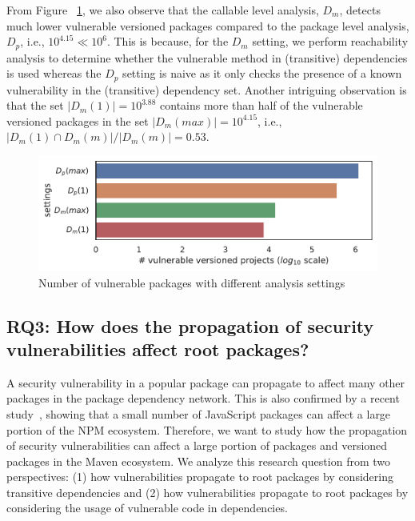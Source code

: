 From Figure ~\ref{ch3:fig:vuln_pkgs_analysis_comparison}, we also observe that the callable level analysis, $D_{m}$, detects much lower vulnerable versioned packages compared to the package level analysis, $D_{p}$, i.e., $10^{4.15} \ll 10^{6}$. This is because, for the $D_{m}$ setting, we perform reachability analysis to determine whether the vulnerable method in (transitive) dependencies is used whereas the $D_{p}$ setting is naive as it only checks the presence of a known vulnerability in the (transitive) dependency set. Another intriguing observation is that the set $|D_{m}(1)|=10^{3.88}$ contains more than half of the vulnerable versioned packages in the set $|D_{m}(max)|=10^{4.15}$, i.e., $|D_{m}(1) \cap D_{m}(m)|/|D_m(m)|=0.53$.

\begin{figure}[!t]
    \centering
    \includegraphics[width=\columnwidth]{chapters/ch3/figs/vuln_pkg_ver_dp_vs_dm.pdf}
    \caption{Number of vulnerable packages with different analysis settings}
    \label{ch3:fig:vuln_pkgs_analysis_comparison}
\end{figure}

\subsection{\textbf{RQ3}: How does the propagation of security vulnerabilities affect root packages?}

A security vulnerability in a popular package can propagate to affect many other packages in the package dependency network. This is also confirmed by a recent study~\cite{zimmermann2019small}, showing that a small number of JavaScript packages can affect a large portion of the NPM ecosystem. Therefore, we want to study how the propagation of security vulnerabilities can affect a large portion of packages and versioned packages in the Maven ecosystem. We analyze this research question from two perspectives: (1) how vulnerabilities propagate to root packages by considering transitive dependencies and (2) how vulnerabilities propagate to root packages by considering the usage of vulnerable code in dependencies.

